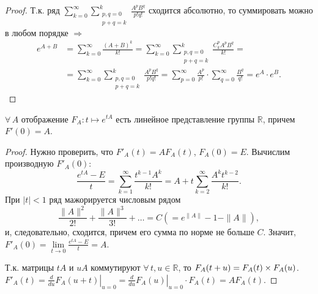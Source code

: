 \documentclass[a4paper]{article}
\newcommand*{\p}[1]{#1\nobreak\discretionary{}{\hbox{$\mathsurround=0pt #1$}}{}}
\begin{document}
\begin{proof}
Т.к. ряд $\sum\limits_{k=0}^\infty\sum\limits_{\substack{p,q=0\\
p+q=k}}^k\frac{A^pB^q}{p!q!}$ сходится абсолютно, то суммировать
можно в любом порядке $\Rightarrow$
$$\begin{aligned}
e^{A+B}&= \sum\limits_{k=0}^\infty\frac{(A+B)^k}{k!}=
\sum\limits_{k=0}^\infty\sum\limits_{\substack{p,q=0\\p+q=k}}^k\frac{C_k^pA^pB^q}{k!}=\\
&=\sum\limits_{k=0}^\infty\sum\limits_{\substack{p,q=0\\
p+q=k}}^k\frac{A^pB^q}{p!q!}=\sum\limits_{p=0}^\infty\frac{A^p}{p!}\cdot
\sum\limits_{q=0}^\infty\frac{B^q}{q!}=e^A\cdot e^B.
\end{aligned}$$
\end{proof}

\begin{theorem}
$\forall \, A$ отображение $F_A\colon t\mapsto e^{tA}$ есть линейное
представление группы $\mathbb{R}$, причем $F'(0)=A$.
\end{theorem}

\begin{proof}
Нужно проверить, что $F'_A(t)=AF_A(t)$, $F_A(0)=E$. Вычислим
производную $F'_A(0)$:
$$\frac{e^{tA}-E}{t}=\sum\limits_{k=1}^\infty \frac{t^{k-1}A^k}{k!}=
A+t\sum\limits_{k=2}^\infty\frac{A^kt^{k-2}}{k!}.$$ При $|t|<1$ ряд
мажорируется числовым рядом
$$\frac{\|A\|^2}{2!}+\frac{\|A\|^3}{3!}+\ldots=C(=e^{\|A\|}-1-\|A\|),$$
и, следовательно, сходится, причем его сумма по норме не больше $C$.
Значит, $F'_A(0)=\lim\limits_{t\to 0}\frac{e^{tA}-E}{t}=A$.

Т.к. матрицы $tA$ и $uA$ коммутируют $\forall \, t,u\in\mathbb{R}$,
то $F_A(t+u)=F_A(t)\p\times F_A(u)$.
$F'_A(t)=\left.\frac{d}{du}F_A(u+t)\right|_{u=0}=\left.\frac{d}{du}
F_A(u)\right|_{u=0}\cdot F_A(t)=AF_A(t)$.
\end{proof}
\end{document}
